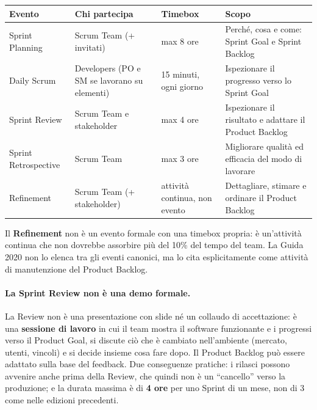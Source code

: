 \documentclass[12pt]{extarticle}
\begin{document}
\begin{center}
\small
\begin{tabular}{p{2.8cm}p{4.6cm}p{3.2cm}p{4.0cm}}
    \toprule
    \textbf{Evento} & \textbf{Chi partecipa} & \textbf{Timebox} & \textbf{Scopo} \\
    \midrule
    Sprint Planning & Scrum Team (+ invitati) & max 8 ore & Perché, cosa e come: Sprint Goal e Sprint Backlog \\
    \addlinespace
    Daily Scrum & Developers (PO e SM se lavorano su elementi) & 15 minuti, ogni giorno & Ispezionare il progresso verso lo Sprint Goal \\
    \addlinespace
    Sprint Review & Scrum Team e stakeholder & max 4 ore & Ispezionare il risultato e adattare il Product Backlog \\
    \addlinespace
    Sprint Retrospective & Scrum Team & max 3 ore & Migliorare qualità ed efficacia del modo di lavorare \\
    \addlinespace
    Refinement & Scrum Team (+ stakeholder) & attività continua, non evento & Dettagliare, stimare e ordinare il Product Backlog \\
    \bottomrule
\end{tabular}
\end{center}

\noindent Il \textbf{Refinement} non è un evento formale con una timebox propria: è un'attività continua che non dovrebbe assorbire più del 10\% del tempo del team. La Guida 2020 non lo elenca tra gli eventi canonici, ma lo cita esplicitamente come attività di manutenzione del Product Backlog.

\paragraph{La Sprint Review non è una demo formale.}
La Review non è una presentazione con slide né un collaudo di accettazione: è una \textbf{sessione di lavoro} in cui il team mostra il software funzionante e i progressi verso il Product Goal, si discute ciò che è cambiato nell'ambiente (mercato, utenti, vincoli) e si decide insieme cosa fare dopo. Il Product Backlog può essere adattato sulla base del feedback. Due conseguenze pratiche: i rilasci possono avvenire anche prima della Review, che quindi non è un ``cancello'' verso la produzione; e la durata massima è di \textbf{4 ore} per uno Sprint di un mese, non di 3 come nelle edizioni precedenti.
\end{document}

